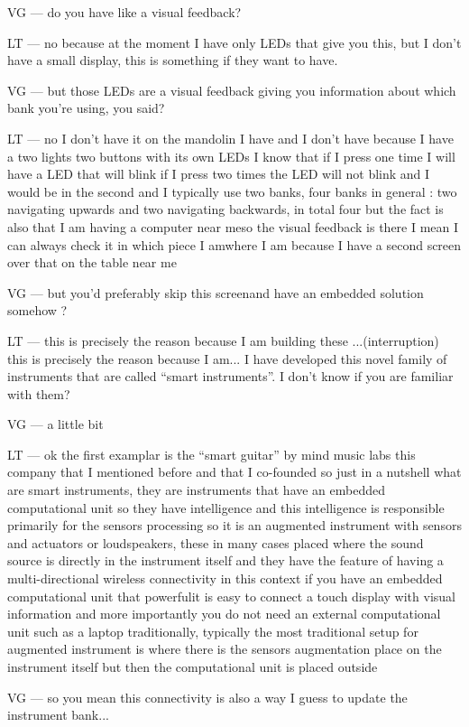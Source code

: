 VG — do you have like a visual feedback?

LT — no because at the moment I have only LEDs that give you this, but I don't have a small display, this is something if they want to have.

VG — but those LEDs are a visual feedback giving you information about which bank you're using, you said?

LT — no I don't have it on the mandolin I have and I don't have because I have a two lights two buttons with its own LEDs I know that if I press one time I will have a LED that will blink if I press two times the LED will not blink and I would be in the second and I typically use two banks, four banks in general : two navigating upwards and two navigating backwards, in total four but the fact is also that I am having a computer near meso the visual feedback is there I mean I can always check it in which piece I amwhere I am because I have a second screen over that on the table near me

VG — but you'd preferably skip this screenand have an embedded solution somehow ?

LT — this is precisely the reason because I am building these ...(interruption) this is precisely the reason because I am... I have developed this novel family of instruments that are called ``smart instruments''. I don't know if you are familiar with them?

VG — a little bit

LT — ok the first examplar is the ``smart guitar'' by mind music labs this company that I mentioned before and that I co-founded so just in a nutshell what are smart instruments, they are instruments that have an embedded computational unit so they have intelligence and this intelligence is responsible primarily for the sensors processing so it is an augmented instrument with sensors and actuators or loudspeakers, these in many cases placed where the sound source is directly in the instrument itself and they have the feature of having a multi-directional wireless connectivity in this context if you have an embedded computational unit that powerfulit is easy to connect a touch display with visual information and more importantly you do not need an external computational unit such as a laptop traditionally, typically the most traditional setup for augmented instrument is where there is the sensors augmentation place on the instrument itself but then the computational unit is placed outside

VG — so you mean this connectivity is also a way I guess to update the instrument bank... 

